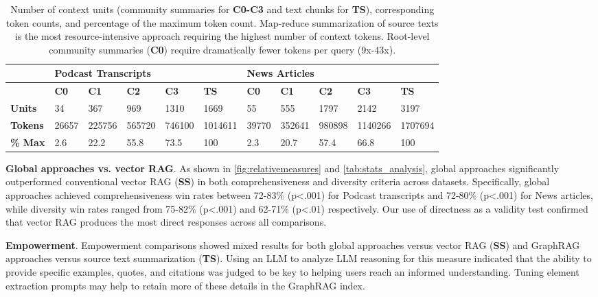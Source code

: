 \documentclass{article}
\begin{document}
\begin{table}

    \caption{Number of context units (community summaries for \textbf{C0-C3} and text chunks for \textbf{TS}), corresponding token counts, and percentage of the maximum token count. Map-reduce summarization of source texts is the most resource-intensive approach requiring the highest number of context tokens. Root-level community summaries (\textbf{C0}) require dramatically fewer tokens per query (9x-43x).}
    \small
    \centering
    \def\arraystretch{1.25}%
    \begin{tabularx}{\textwidth}{lXXXXXXXXXX} \hline           
    & \multicolumn{5}{l}{\textbf{Podcast Transcripts}} & \multicolumn{5}{l}{\textbf{News Articles}} \\ \hline 
    & \textbf{C0} & \textbf{C1} & \textbf{C2} & \textbf{C3} & \textbf{TS} & \textbf{C0} & \textbf{C1} & \textbf{C2} & \textbf{C3} & \textbf{TS} \\ \hline 
    \textbf{Units} & 34 & 367 & 969 & 1310 & 1669 & 55 & 555 & 1797 & 2142 & 3197 \\ \hline 
    \textbf{Tokens} & 26657 & 225756 & 565720 & 746100 & 1014611 & 39770 & 352641 & 980898 & 1140266 & 1707694 \\ \hline
    \textbf{\% Max} & 2.6 & 22.2 & 55.8 & 73.5 & 100 & 2.3 & 20.7 & 57.4 & 66.8 & 100 \\ \hline
    \end{tabularx}

    \label{tab:community summaries}
\end{table}





\textbf{Global approaches vs. vector RAG}. As shown in \autoref{fig:relativemeasures} and \autoref{tab:stats_analysis}, global approaches significantly outperformed conventional vector RAG (\textbf{SS}) in both comprehensiveness and diversity criteria across datasets.
Specifically, global approaches achieved comprehensiveness win rates between 72-83\% (p\textless .001) for Podcast transcripts and 72-80\% (p\textless.001) for News articles, while diversity win rates ranged from 75-82\% (p\textless.001) and 62-71\% (p\textless.01) respectively.
Our use of directness as a validity test confirmed that vector RAG produces the most direct responses across all comparisons. 

\textbf{Empowerment}. Empowerment comparisons showed mixed results for both global approaches versus vector RAG (\textbf{SS}) and GraphRAG approaches versus source text summarization (\textbf{TS}).
Using an LLM to analyze LLM reasoning for this measure indicated that the ability to provide specific examples, quotes, and citations was judged to be key to helping users reach an informed understanding.
Tuning element extraction prompts may help to retain more of these details in the GraphRAG index.
\end{document}
